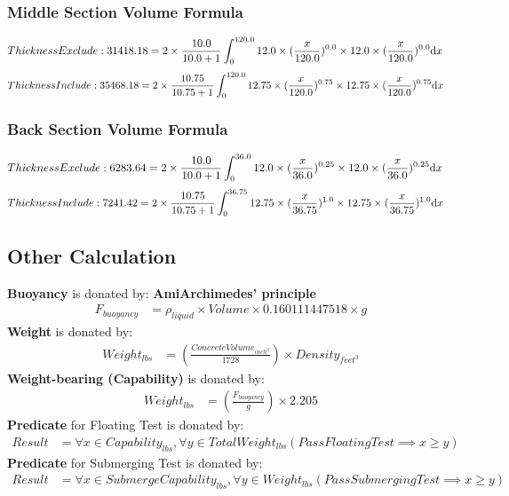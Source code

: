 \documentclass{article}%
\begin{document}
%
\subsubsection{Middle Section Volume Formula}%
\label{ssubsec:MiddleSectionVolumeFormula}%
\begin{align}%
Thickness Exclude: 31418.18 &=2\times \frac{10.0}{10.0+1} \int_0^{120.0} 12.0\times(\frac{x}{120.0})^{0.0}\times 12.0\times(\frac{x}{120.0})^{0.0} \mathrm{d}x \notag%
\end{align}%
\begin{align}%
Thickness Include: 35468.18 &=2\times \frac{10.75}{10.75+1} \int_0^{120.0} 12.75\times(\frac{x}{120.0})^{0.75}\times 12.75\times(\frac{x}{120.0})^{0.75} \mathrm{d}x \notag%
\end{align}

%
\subsubsection{Back Section Volume Formula}%
\label{ssubsec:BackSectionVolumeFormula}%
\begin{align}%
Thickness Exclude: 6283.64 &=2\times \frac{10.0}{10.0+1} \int_0^{36.0} 12.0\times(\frac{x}{36.0})^{0.25}\times 12.0\times(\frac{x}{36.0})^{0.25} \mathrm{d}x \notag%
\end{align}%
\begin{align}%
Thickness Include: 7241.42 &=2\times \frac{10.75}{10.75+1} \int_0^{36.75} 12.75\times(\frac{x}{36.75})^{1.0}\times 12.75\times(\frac{x}{36.75})^{1.0} \mathrm{d}x \notag%
\end{align}

%
\subsection{Other Calculation}%
\label{subsec:OtherCalculation}%
\textbf{Buoyancy} is donated by: \textbf{AmiArchimedes' principle}%
\begin{align}%
F_{buoyancy} &=\rho_{liquid}\times Volume\times 0.160111447518 \times g\label{C}%
\end{align}%
\textbf{Weight} is donated by: %
\begin{align}%
Weight_{lbs} &=(\frac{ConcreteVolume_{inch^2}}{1728})\times Density_{feet^3}\label{D}%
\end{align}%
\textbf{Weight-bearing (Capability)} is donated by: %
\begin{align}%
Weight_{lbs} &=(\frac{F_{buoyancy}}{g})\times 2.205 \label{E}%
\end{align}%
\textbf{Predicate} for Floating Test is donated by: %
\begin{align}%
Result &= \forall x\in Capability_{lbs}, \forall y\in TotalWeight_{lbs} (Pass Floating Test \implies x \geq y) \label{E}%
\end{align}%
\textbf{Predicate} for Submerging Test is donated by: %
\begin{align}%
Result &= \forall x\in SubmergeCapability_{lbs}, \forall y\in Weight_{lbs} (Pass Submerging Test \implies x \geq y) \label{F}%
\end{align}
\end{document}
